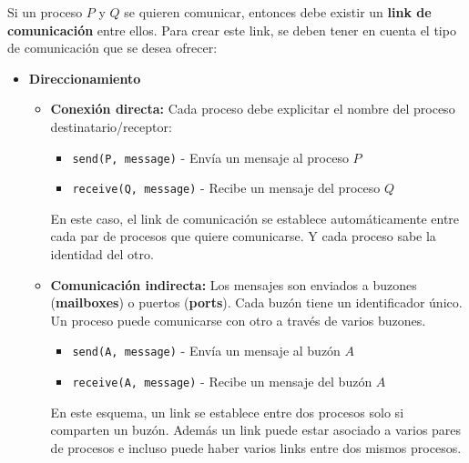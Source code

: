 Si un proceso $P$ y $Q$ se quieren comunicar, entonces debe existir un \textbf{link de comunicación} entre ellos. Para crear este link, se deben tener en cuenta el tipo de comunicación que se desea ofrecer:
\begin{itemize}
	\item \textbf{Direccionamiento}
	\begin{itemize}
		\item \textbf{Conexión directa:} Cada proceso debe explicitar el nombre del proceso destinatario/receptor:
		\begin{itemize}
			\item \texttt{send(P, message)} - Envía un mensaje al proceso $P$
			\item \texttt{receive(Q, message)} - Recibe un mensaje del proceso $Q$
		\end{itemize}

		En este caso, el link de comunicación se establece automáticamente entre cada par de procesos que quiere comunicarse. Y cada proceso sabe la identidad del otro.

		\item \textbf{Comunicación indirecta:} Los mensajes son enviados a buzones (\textbf{mailboxes}) o puertos (\textbf{ports}). Cada buzón tiene un identificador único. Un proceso puede comunicarse con otro a través de varios buzones.
		\begin{itemize}
			\item \texttt{send(A, message)} - Envía un mensaje al buzón $A$
			\item \texttt{receive(A, message)} - Recibe un mensaje del buzón $A$
		\end{itemize}

		En este esquema, un link se establece entre dos procesos solo si comparten un buzón. Además un link puede estar asociado a varios pares de procesos e incluso puede haber varios links entre dos mismos procesos.


\end{itemize}
\end{itemize}
